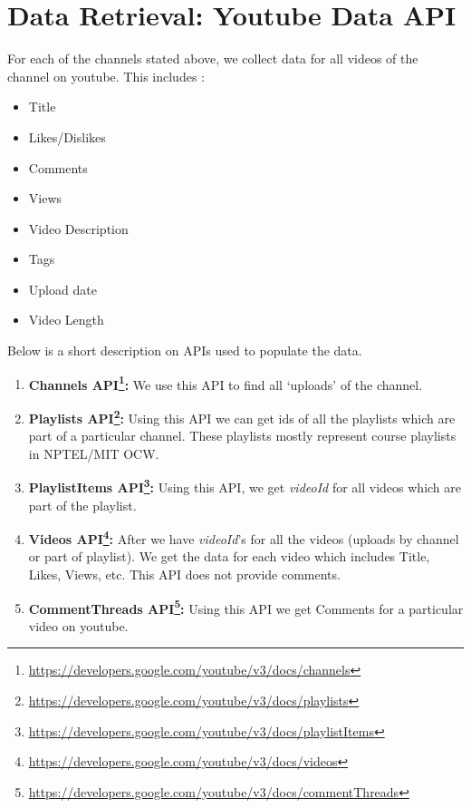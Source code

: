 \documentclass{article}
\begin{document}
\section{Data Retrieval: Youtube Data API}
For each of the channels stated above, we collect data for all videos of the channel on youtube. This includes : 
\begin{itemize}
    \item Title
    \item Likes/Dislikes
    \item Comments
    \item Views
    \item Video Description
    \item Tags
    \item Upload date
    \item Video Length
\end{itemize}
Below is a short description on APIs used to populate the data.
\begin{enumerate}
    \item \textbf{Channels API\footnote{\url{https://developers.google.com/youtube/v3/docs/channels}}:} We use this API to find all `uploads' of the channel.
    \item \textbf{Playlists API\footnote{\url{https://developers.google.com/youtube/v3/docs/playlists}}:} Using this API we can get ids of all the playlists which are part of a particular channel. These playlists mostly represent course playlists in NPTEL/MIT OCW.
    \item \textbf{PlaylistItems API\footnote{\url{https://developers.google.com/youtube/v3/docs/playlistItems}}:} Using this API, we get \textit{videoId} for all videos which are part of the playlist.
    \item \textbf{Videos API\footnote{\url{https://developers.google.com/youtube/v3/docs/videos}}:} After we have \textit{videoId}'s for all the videos (uploads by channel or part of playlist). We get the data for each video which includes Title, Likes, Views, etc. This API does not provide comments.
    \item \textbf{CommentThreads API\footnote{\url{https://developers.google.com/youtube/v3/docs/commentThreads}}:} Using this API we get Comments for a particular video on youtube. 
\end{enumerate}
\end{document}
